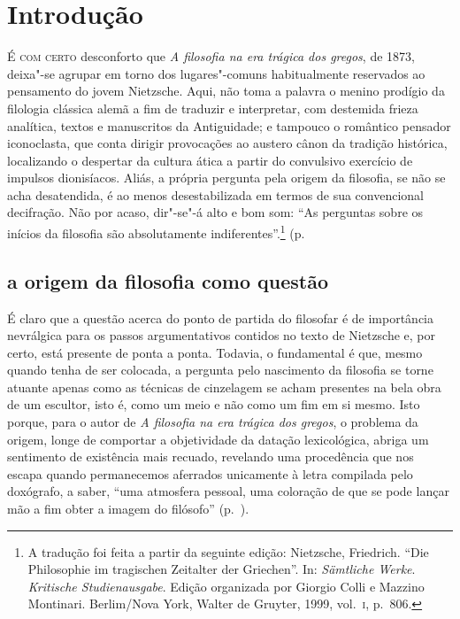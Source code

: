 
\chapter[Introdução, por Fernando R.~de Moraes Barros]{Introdução}

\textsc{É com certo} desconforto que \textit{A filosofia na era trágica dos
 gregos}, de 1873, deixa"-se agrupar em torno dos lugares"-comuns
 habitualmente reservados ao pensamento do jovem Nietzsche. Aqui, não toma a
 palavra o menino prodígio da filologia clássica alemã a fim de traduzir e
 interpretar, com destemida frieza analítica, textos e manuscritos da
 Antiguidade; e tampouco o romântico pensador iconoclasta, que conta dirigir
 provocações ao austero cânon da tradição histórica, localizando o despertar
 da cultura ática a partir do convulsivo exercício de impulsos dionisíacos.
 Aliás, a própria pergunta pela origem da filosofia, se não se acha
 desatendida, é ao menos desestabilizada em termos de sua convencional
 decifração. Não por acaso, dir"-se"-á alto e bom som: ``As perguntas sobre
 os inícios da filosofia são absolutamente indiferentes''.\footnote {A
 tradução foi feita a partir da seguinte edição: Nietzsche, Friedrich. ``Die
 Philosophie im tragischen Zeitalter der Griechen''. In:
\textit{Sämtliche Werke}. \textit{Kritische Studienausgabe}. Edição organizada
 por Giorgio Colli e Mazzino Montinari. Berlim/Nova York, Walter de Gruyter,
 1999, vol.~\textsc{i}, p.~806.} (p.~\pageref{perguntassobreosinicios)} 

\section{a origem da filosofia como questão} 

É claro que a questão acerca do ponto de partida do filosofar é de importância nevrálgica para os passos
 argumentativos contidos no texto de Nietzsche e, por certo, está presente de
 ponta a ponta. Todavia, o fundamental é que, mesmo quando tenha de ser
 colocada, a pergunta pelo nascimento da filosofia se torne atuante apenas
 como as técnicas de cinzelagem se acham presentes na bela obra de um
 escultor, isto é, como um meio e não como um fim em si mesmo. Isto porque,
 para o autor de
\textit{A filosofia na era trágica dos gregos}, o problema da origem, longe de
 comportar a objetividade da datação lexicológica, abriga um sentimento de
 existência mais recuado, revelando uma procedência que nos escapa quando
 permanecemos aferrados unicamente à letra compilada pelo doxógrafo, a saber,
 ``uma atmosfera pessoal, uma coloração de que se pode lançar mão a fim obter
 a imagem do filósofo'' (p.~\pageref{atmosferapessoal}). 

